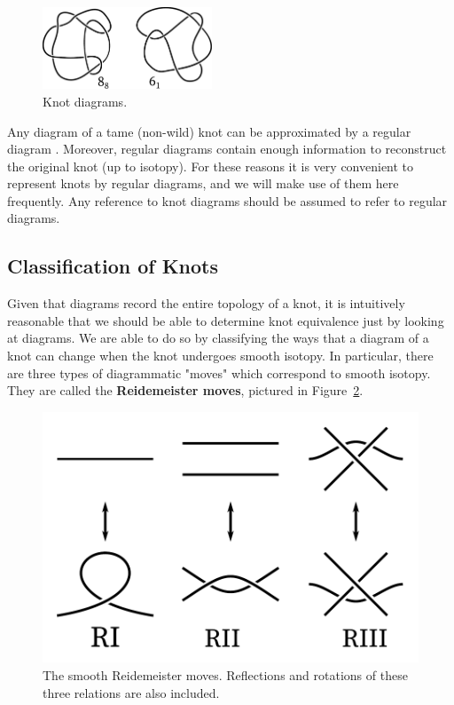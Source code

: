 \begin{figure}[ht]
    \centering
    \includegraphics[width=0.45\textwidth]{images/smooth-knots.pdf}
    \caption{Knot diagrams.}
    \label{fig:diagrams}
\end{figure}

Any diagram of a tame (non-wild) knot can be approximated by a regular diagram \cite{murasugi1996}.
Moreover, regular diagrams contain enough information to reconstruct the original knot (up to isotopy). For these reasons it is very convenient to represent knots by regular diagrams, and we will make use of them here frequently. Any reference to knot diagrams should be assumed to refer to regular diagrams.

\subsection{Classification of Knots}\label{subsec:smooth-classification}

Given that diagrams record the entire topology of a knot, it is intuitively reasonable that we should be able to determine knot equivalence just by looking at diagrams. We are able to do so by classifying the ways that a diagram of a knot can change when the knot undergoes smooth isotopy. In particular, there are three types of diagrammatic "moves" which correspond to smooth isotopy. They are called the \textbf{Reidemeister moves}, pictured in Figure~\ref{fig:redemeister-smooth}.

\begin{figure}[ht!]
    \centering
    \includegraphics[width=0.45\linewidth]{images/smooth-redeimeister.pdf}
    \caption{The smooth Reidemeister moves. Reflections and rotations of these three relations are also included.}
    \label{fig:redemeister-smooth}
\end{figure}

